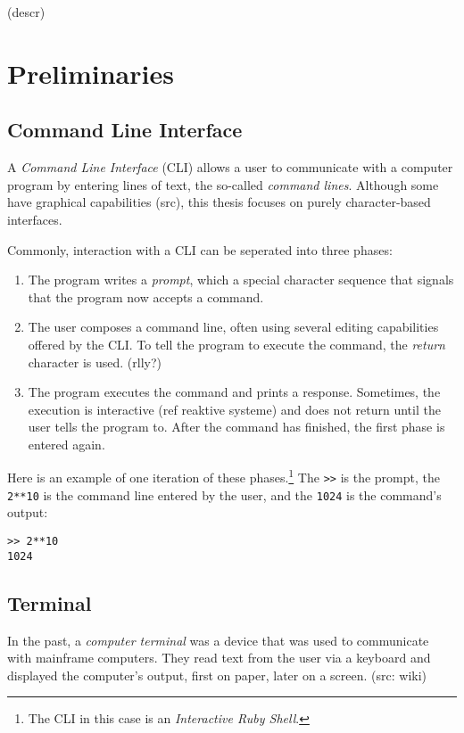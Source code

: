 \documentclass[twoside,parskip]{scrreprt}
\begin{document}
(descr)

\chapter{Preliminaries}

\section{Command Line Interface}

A \emph{Command Line Interface} (\textsc{CLI}) allows a user to communicate with a computer program by entering lines of text, the so-called \emph{command lines}. Although some have graphical capabilities (src), this thesis focuses on purely character-based interfaces.

Commonly, interaction with a \textsc{CLI} can be seperated into three phases:

\begin{enumerate}
    \item The program writes a \emph{prompt}, which a special character sequence that signals that the program now accepts a command.
    \item The user composes a command line, often using several editing capabilities offered by the CLI. To tell the program to execute the command, the \emph{return} character is used. (rlly?)
    \item The program executes the command and prints a response. Sometimes, the execution is interactive (ref reaktive systeme) and does not return until the user tells the program to. After the command has finished, the first phase is entered again.
\end{enumerate}

Here is an example of one iteration of these phases.\footnote{The \textsc{CLI} in this case is an \emph{Interactive Ruby Shell}.} The \texttt{>\->} is the prompt, the \texttt{2**10} is the command line entered by the user, and the \texttt{1024} is the command's output:

\begin{lstlisting}
>> 2**10
1024
\end{lstlisting}

\section{Terminal}

In the past, a \emph{computer terminal} was a device that was used to communicate with mainframe computers. They read text from the user via a keyboard and displayed the computer's output, first on paper, later on a screen. (src: wiki)
\end{document}
